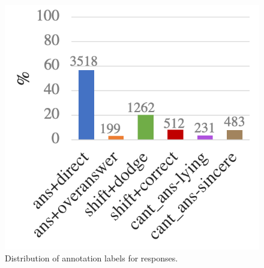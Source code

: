 \begin{figure}
\centering
\includegraphics[scale=.47]{plots/subj_response_dist.pdf}
\vspace{-1.0em}
\caption{Distribution of annotation labels for responses.}
\label{fig:subj_response_dist}
\end{figure}





